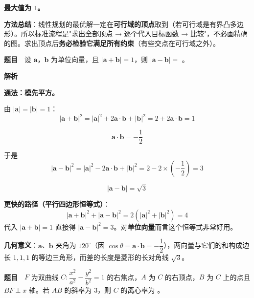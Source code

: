 \textbf{最大值为 $1$。}


\begin{gktip}
\textbf{方法总结}：线性规划的最优解一定在\textbf{可行域的顶点}取到（若可行域是有界凸多边形）。所以标准流程是"求出全部顶点 → 逐个代入目标函数 → 比较"，不必画精确的图。求出顶点后\textbf{务必检验它满足所有约束}（有些交点在可行域之外）。
\end{gktip}

\par\medskip


\textbf{题目}　设 $\boldsymbol a$，$\boldsymbol b$ 为单位向量，且 $|\boldsymbol a+\boldsymbol b|=1$，则 $|\boldsymbol a-\boldsymbol b|=$ \gkblank{}。

\textbf{解析}

\textbf{通法：模先平方。}

由 $|\boldsymbol a|=|\boldsymbol b|=1$：
\[|\boldsymbol a+\boldsymbol b|^{2}=|\boldsymbol a|^{2}+2\boldsymbol a\cdot\boldsymbol b+|\boldsymbol b|^{2}=2+2\boldsymbol a\cdot\boldsymbol b=1\]

\[\boldsymbol a\cdot\boldsymbol b=-\frac12\]

于是
\[|\boldsymbol a-\boldsymbol b|^{2}=|\boldsymbol a|^{2}-2\boldsymbol a\cdot\boldsymbol b+|\boldsymbol b|^{2}=2-2\times\left(-\frac12\right)=3\]

\[|\boldsymbol a-\boldsymbol b|=\sqrt3\]


\begin{gktip}
\textbf{更快的路径（平行四边形恒等式）}：
\[|\boldsymbol a+\boldsymbol b|^{2}+|\boldsymbol a-\boldsymbol b|^{2}=2\left(|\boldsymbol a|^{2}+|\boldsymbol b|^{2}\right)=4\]
代入 $|\boldsymbol a+\boldsymbol b|=1$ 直接得 $|\boldsymbol a-\boldsymbol b|^{2}=3$。对\textbf{单位向量}而言这个恒等式非常好用。

\textbf{几何意义}：$\boldsymbol a$、$\boldsymbol b$ 夹角为 $120^\circ$（因 $\cos\theta=\boldsymbol a\cdot\boldsymbol b=-\dfrac12$），两向量与它们的和构成边长 $1,1,1$ 的等边三角形，而差的长度是菱形的长对角线 $\sqrt3$。
\end{gktip}

\par\medskip


\textbf{题目}　$F$ 为双曲线 $C:\dfrac{x^{2}}{a^{2}}-\dfrac{y^{2}}{b^{2}}=1$ 的右焦点，$A$ 为 $C$ 的右顶点，$B$ 为 $C$ 上的点且 $BF\perp x$ 轴。若 $AB$ 的斜率为 $3$，则 $C$ 的离心率为 \gkblank{}。

